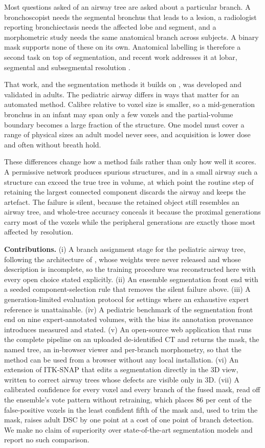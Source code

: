 \documentclass[runningheads]{llncs}
\begin{document}
Most questions asked of an airway tree are asked about a particular branch. A
bronchoscopist needs the segmental bronchus that leads to a lesion, a
radiologist reporting bronchiectasis needs the affected lobe and segment, and a
morphometric study needs the same anatomical branch across subjects. A binary
mask supports none of these on its own. Anatomical labelling is therefore a second task on top of
segmentation, and recent work addresses it at lobar, segmental and subsegmental
resolution \cite{zhang2025airmorph}.

That work, and the segmentation methods it builds on \cite{carmo2024medpseg,wu2025tfenet}, was developed and validated in adults. The pediatric airway
differs in ways that matter for an automated method. Calibre relative to voxel
size is smaller, so a mid-generation bronchus in an infant may span only a few
voxels and the partial-volume boundary becomes a large fraction of the
structure. One model must cover a range of physical sizes an adult model never
sees, and acquisition is lower dose and often without breath hold.

These differences change how a method fails rather than only how well it scores.
A permissive network produces spurious structures, and in a small airway such a
structure can exceed the true tree in volume, at which point the routine step of
retaining the largest connected component discards the airway and keeps the
artefact. The failure is silent, because the retained object still resembles an
airway tree, and whole-tree accuracy conceals it because the proximal
generations carry most of the voxels while the peripheral generations are
exactly those most affected by resolution.

\smallskip\noindent\textbf{Contributions.}
(i) A branch assignment stage for the pediatric airway tree, following the
architecture of \cite{zhang2025airmorph}, whose weights were never released and
whose description is incomplete, so the training procedure was reconstructed
here with every open choice stated explicitly. (ii) An ensemble segmentation
front end with a seeded component-selection rule that removes the silent failure
above. (iii) A generation-limited evaluation protocol for settings where an
exhaustive expert reference is unattainable. (iv) A pediatric benchmark of the
segmentation front end on nine expert-annotated volumes, with the bias its
annotation provenance introduces measured and stated. (v) An open-source web
application that runs the complete pipeline on an uploaded de-identified CT and
returns the mask, the named tree, an in-browser viewer and per-branch
morphometry, so that the method can be used from a browser without any local
installation. (vi) An extension of ITK-SNAP that edits a segmentation directly
in the 3D view, written to correct airway trees whose defects are visible only
in 3D. (vii) A calibrated confidence for every voxel and every branch of the
fused mask, read off the ensemble's vote pattern without retraining, which
places 86 per cent of the false-positive voxels in the least confident fifth
of the mask and, used to trim the mask, raises adult DSC by one point at
a cost of one point of branch detection. We make no claim of superiority over state-of-the-art segmentation
models and report no such comparison.
\end{document}
